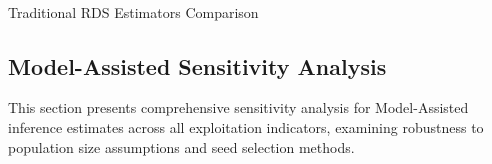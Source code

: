 \documentclass[
  12pt,
  letterpaper,
  DIV=11,
  numbers=noendperiod]{scrartcl}
\makeatletter
\let\oldparagraph\paragraph
\renewcommand{\paragraph}{
    \@ifstar
      \xxxParagraphStar
      \xxxParagraphNoStar
  }
\newcommand{\xxxParagraphStar}[1]{\oldparagraph*{#1}\mbox{}}
\newcommand{\xxxParagraphNoStar}[1]{\oldparagraph{#1}\mbox{}}
\theoremstyle{plain}
\theoremstyle{definition}
\makeatother
\begin{document}
\begin{table}
{}

\end{table}%

\paragraph{Traditional RDS Estimators
Comparison}\label{traditional-rds-estimators-comparison}

\begin{table}

\caption{\label{tbl-rds-comparison}RDS Estimator Comparison for Binary
Indicators. Source: Authors' Own Work.}


\end{table}%

\subsection{Model-Assisted Sensitivity
Analysis}\label{model-assisted-sensitivity-analysis}

This section presents comprehensive sensitivity analysis for
Model-Assisted inference estimates across all exploitation indicators,
examining robustness to population size assumptions and seed selection
methods.
\end{document}
